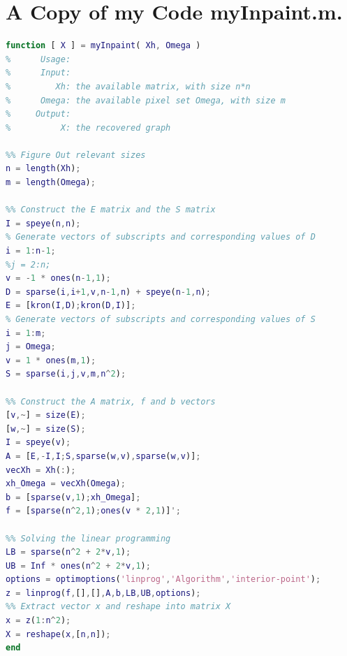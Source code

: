 \documentclass[11pt]{article}
\begin{document}
\section*{A Copy of my Code myInpaint.m.}
\begin{lstlisting}[language=matlab]
function [ X ] = myInpaint( Xh, Omega )
%      Usage:
%      Input:
%         Xh: the available matrix, with size n*n
%      Omega: the available pixel set Omega, with size m
%     Output:
%          X: the recovered graph

%% Figure Out relevant sizes
n = length(Xh);
m = length(Omega);

%% Construct the E matrix and the S matrix
I = speye(n,n);
% Generate vectors of subscripts and corresponding values of D
i = 1:n-1;
%j = 2:n;
v = -1 * ones(n-1,1);
D = sparse(i,i+1,v,n-1,n) + speye(n-1,n);
E = [kron(I,D);kron(D,I)];
% Generate vectors of subscripts and corresponding values of S
i = 1:m;
j = Omega;
v = 1 * ones(m,1);
S = sparse(i,j,v,m,n^2);

%% Construct the A matrix, f and b vectors
[v,~] = size(E);
[w,~] = size(S);
I = speye(v);
A = [E,-I,I;S,sparse(w,v),sparse(w,v)];
vecXh = Xh(:);
xh_Omega = vecXh(Omega);
b = [sparse(v,1);xh_Omega];
f = [sparse(n^2,1);ones(v * 2,1)]';

%% Solving the linear programming
LB = sparse(n^2 + 2*v,1);
UB = Inf * ones(n^2 + 2*v,1);
options = optimoptions('linprog','Algorithm','interior-point');
z = linprog(f,[],[],A,b,LB,UB,options);
%% Extract vector x and reshape into matrix X
x = z(1:n^2);
X = reshape(x,[n,n]);
end
\end{lstlisting}
\end{document}
